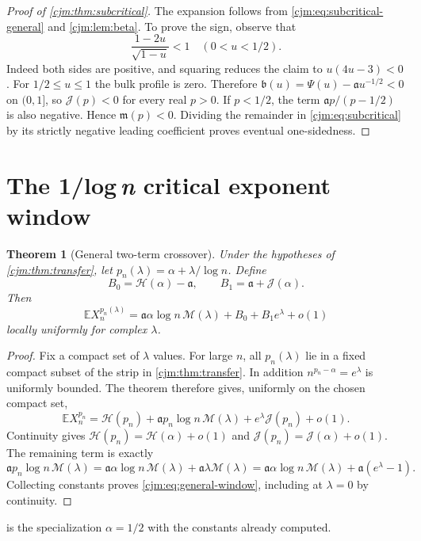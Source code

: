\documentclass[11pt,a4paper]{article}
\newtheorem{theorem}{Theorem}[section]
\theoremstyle{definition}\newaliascnt{definition}{theorem}
\theoremstyle{remark}\newaliascnt{remark}{theorem}
\newcommand{\ljE}{\mathbb E}
\begin{document}
\begin{proof}[Proof of \cref{cjm:thm:subcritical}]
The expansion follows from \eqref{cjm:eq:subcritical-general} and
\cref{cjm:lem:beta}. To prove the sign, observe that
\[
 \frac{1-2u}{\sqrt{1-u}}<1\quad(0<u<1/2).
\]
Indeed both sides are positive, and squaring reduces the claim to
$u(4u-3)<0$. For $1/2\le u\le1$ the bulk profile is zero. Therefore
$\mathfrak b(u)=\Psi(u)-\mathfrak a u^{-1/2}<0$ on $(0,1]$, so
$\mathcal J(p)<0$ for every real $p>0$. If $p<1/2$, the term
$\mathfrak ap/(p-1/2)$ is also negative. Hence $\mathfrak m(p)<0$. Dividing
the remainder in \eqref{cjm:eq:subcritical} by its strictly negative
leading coefficient proves eventual one-sidedness.
\end{proof}

\section{The \texorpdfstring{1/log\,\textit{n}}{1/log n} critical exponent window}
\label{cjm:sec:window}

\begin{theorem}[General two-term crossover]
\label{cjm:thm:general-window}
Under the hypotheses of \cref{cjm:thm:transfer}, let
$p_n(\lambda)=\alpha+\lambda/\log n$. Define
\[
 B_0=\mathcal H(\alpha)-\mathfrak a,\qquad B_1=\mathfrak a+\mathcal J(\alpha).
\]
Then
\begin{equation}
 \ljE X_n^{p_n(\lambda)}
 =\mathfrak a\alpha\log n\,\mathcal M(\lambda)+B_0+B_1e^\lambda+o(1)
 \label{cjm:eq:general-window}
\end{equation}
locally uniformly for complex $\lambda$.
\end{theorem}
\begin{proof}
Fix a compact set of $\lambda$ values. For large $n$, all $p_n(\lambda)$
lie in a fixed compact subset of the strip in \cref{cjm:thm:transfer}. In
addition $n^{p_n-\alpha}=e^\lambda$ is uniformly bounded. The theorem
therefore gives, uniformly on the chosen compact set,
\[
 \ljE X_n^{p_n}=\mathcal H(p_n)+\mathfrak a p_n\log n\,\mathcal M(\lambda)
                     +e^\lambda \mathcal J(p_n)+o(1).
\]
Continuity gives $\mathcal H(p_n)=\mathcal H(\alpha)+o(1)$ and
$\mathcal J(p_n)=\mathcal J(\alpha)+o(1)$. The remaining term is exactly
\[
 \mathfrak a p_n\log n\,\mathcal M(\lambda)
 =\mathfrak a\alpha\log n\,\mathcal M(\lambda)+\mathfrak a\lambda\mathcal M(\lambda)
 =\mathfrak a\alpha\log n\,\mathcal M(\lambda)+\mathfrak a(e^\lambda-1).
\]
Collecting constants proves \eqref{cjm:eq:general-window}, including at
$\lambda=0$ by continuity.
\end{proof}
 is the specialization $\alpha=1/2$ with the
constants already computed.
\end{document}
